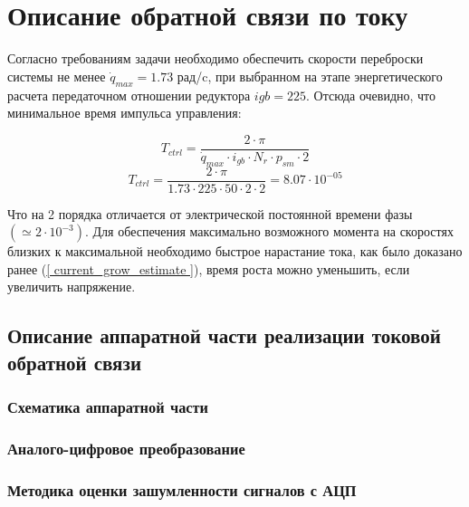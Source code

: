 \newpage
\section{ Описание обратной связи по току }
Согласно требованиям задачи необходимо обеспечить скорости переброски системы не менее 
$ \dot{q}_{max} = 1.73$ рад/c, при выбранном на этапе энергетического расчета передаточном
отношении редуктора $ i{gb} = 225 $. Отсюда очевидно, что минимальное время импульса управления:

$$
    T_{ctrl} = \frac{ 2 \cdot \pi }{ \dot{q}_{max} \cdot i_{gb} \cdot N_{r} \cdot p_{sm} \cdot 2 }
$$
$$
    T_{ctrl} = \frac{ 2 \cdot \pi }{ 1.73 \cdot 225 \cdot 50 \cdot 2 \cdot 2 } = 8.07 \cdot 10^{-05}
$$

Что на 2 порядка отличается от электрической постоянной времени фазы $( \simeq2 \cdot 10^{-3} )$.
Для обеспечения максимально возможного момента на скоростях близких к максимальной необходимо
быстрое нарастание тока, как было доказано ранее (\ref{ current_grow_estimate }), время роста можно
уменьшить, если увеличить напряжение.

\subsection{ Описание аппаратной части реализации токовой обратной связи }

\subsubsection{ Схематика аппаратной части }

\subsubsection{ Аналого-цифровое преобразование }

\subsubsection{ Методика оценки зашумленности сигналов с АЦП }

\endinput

